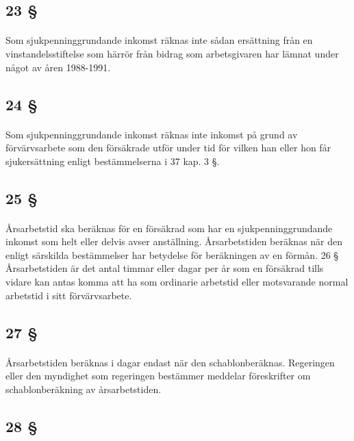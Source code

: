 \documentclass[a4paper,notitlepage,openany,10pt]{book}
\begin{document}
\subsection*{23 §}
\paragraph*{}
Som sjukpenninggrundande inkomst räknas inte sådan ersättning från en vinstandelsstiftelse som härrör från bidrag som arbetsgivaren har lämnat under något av åren 1988-1991.
\subsection*{24 §}
\paragraph*{}
Som sjukpenninggrundande inkomst räknas inte inkomst på grund av förvärvsarbete som den försäkrade utför under tid för vilken han eller hon får sjukersättning enligt bestämmelserna i 37 kap. 3 §.
\subsection*{25 §}
\paragraph*{}
Årsarbetstid ska beräknas för en försäkrad som har en sjukpenninggrundande inkomst som helt eller delvis avser anställning. Årsarbetstiden beräknas när den enligt särskilda bestämmelser har betydelse för beräkningen av en förmån. 26 § Årsarbetstiden är det antal timmar eller dagar per år som en försäkrad tills vidare kan antas komma att ha som ordinarie arbetstid eller motsvarande normal arbetstid i sitt förvärvsarbete.
\subsection*{27 §}
\paragraph*{}
Årsarbetstiden beräknas i dagar endast när den schablonberäknas. Regeringen eller den myndighet som regeringen bestämmer meddelar föreskrifter om schablonberäkning av årsarbetstiden.
\subsection*{28 §}
\end{document}
